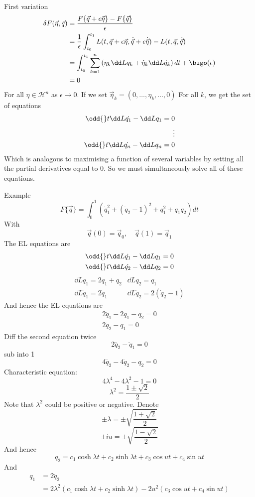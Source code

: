 \documentclass{X:/Documents/Coding/Latex/myassignment}
\begin{document}
First variation
\begin{align*}
	\delta F(\vec \eta,\vec q) &= \frac{F\{\vec q + \epsilon \vec \eta\} - F\{\vec q\}}{\epsilon}\\
	&= \frac1 \epsilon \int_{t_0}^{t_1} L(t,\vec q + \epsilon \vec \eta, \dot{\vec q} + \epsilon \dot{\vec \eta}) - L(t,\vec q, \dot{\vec q})\\
	&= \int_{t_0}^{t_1} \sum_{k=1}^n \left(\eta_k \dd L{q_k} + \dot{\eta}_k \dd L{\dot q_k}\right) dt + \bigo(\epsilon)\\
	&= 0 
\end{align*}
For all $\eta \in \mathcal{H}^n$ as $\epsilon \to 0$.
If we set $\vec \eta_k = (0,\ldots,\eta_k,\ldots,0)$
For all $k$, we get the set of equations
\begin{align*}
	\odd{}t \dd L{\dot{q_1}} - \dd L{q_1} = 0\\
	\vdots\\
	\odd{}t \dd L{\dot{q_n}} - \dd L{q_n} = 0\\
\end{align*}
Which is analogous to maximising a function of several variables by setting all the partial derivatives equal to $0$. So we must simultaneously solve all of these equations.

Example 
\[F\{\vec q\} = \int_0^1 \left(\dot q_1^2 + (\dot q_2 -1 )^2 + q_1^2 + q_1q_2\right) dt\]
With
\[\vec q(0) = \vec q_0, \quad \vec q(1) = \vec q_1\]
The EL equations are
\begin{align*}
	\odd{}t \dd L{\dot{q_1}} - \dd L{q_1} = 0\\
	\odd{}t \dd L{\dot{q_2}} - \dd L{q_2} = 0\\
\end{align*}
\[\begin{matrix}
	\dd L{q_1} = 2q_1 + q_2 & \dd L{q_2} = q_1\\
	\dd L{\dot q_1} = 2\dot q_1 & \dd L{\dot q_2} = 2(\dot q_2 - 1)
\end{matrix}\]
And hence the EL equations are
\begin{align*}
	2\ddot{q}_1 - 2q_1 - q_2 = 0\\
	2 \ddot{q}_2 - q_1 = 0
\end{align*}
Diff the second equation twice
\[2\ddddot{q}_2 - \ddot{q}_1 = 0\]
sub into 1
\[4 \ddddot{q}_2 - 4\ddot q_2 - q_2 = 0\]
Characteristic equation:
\[4 \lambda^4 - 4\lambda^2 - 1 = 0\]
\[\lambda^2 = \frac{1 \pm \sqrt{2}}{2}\]
Note that $\lambda^2$ could be positive or negative. Denote
\[\pm \lambda =\pm \sqrt{\frac{1 + \sqrt{2}}{2}}\]
\[\pm iu = \pm \sqrt{\frac{1 - \sqrt{2}}{2}}\]
And hence
\[q_2 = c_1 \cosh \lambda t + c_2 \sinh \lambda t + c_3 \cos ut + c_4 \sin ut\]
And
\begin{align*}
	q_1 &= 2 \ddot{q}_2 \\
	&= 2 \lambda^2 (c_1 \cosh \lambda t + c_2 \sinh \lambda t) - 2u^2 \left(c_3 \cos ut + c_4 \sin ut\right)
\end{align*}
\end{document}
